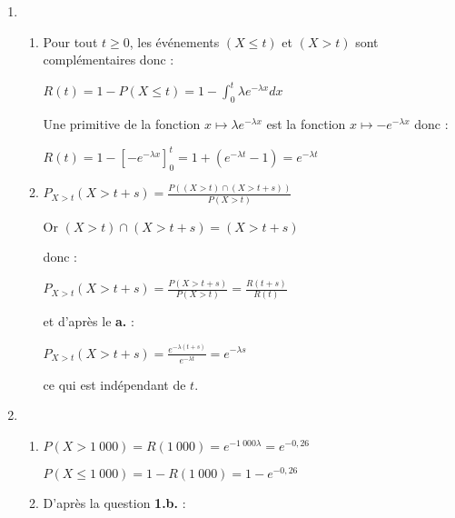 \begin{corrige}
     \begin{enumerate}
          \item
          \begin{enumerate}[label=\alph*.]
               \item  Pour tout $t\geqslant 0$, les événements $\left(X\leqslant t\right)$ et $\left(X > t\right)$ sont complémentaires donc :
               \par
               $R\left(t\right)=1-P\left(X\leqslant t\right)=1-\int_{0}^{t}\lambda  e^{-\lambda  x}dx$
               \par
               Une primitive de la fonction $x\mapsto \lambda  e^{-\lambda  x}$ est la fonction  $x\mapsto -e^{-\lambda  x}$ donc :
               \par
               $R\left(t\right)=1-\left[- e^{-\lambda  x}\right]_{0}^{t}=1+\left(e^{-\lambda  t}-1\right)=e^{-\lambda  t}$
               \item  $P_{X > t}\left(X > t+s\right)=\frac{P\left(\left(X > t\right) \cap  \left(X > t+s\right)\right)}{P\left(X > t\right)}$
               \par
               Or $\left(X > t\right) \cap  \left(X > t+s\right)=\left(X > t+s\right)$
               \par
               donc :
               \par
               $P_{X > t}\left(X > t+s\right)=\frac{P\left(X > t+s\right)}{P\left(X > t\right)}=\frac{R\left(t+s\right)}{R\left(t\right)}$
               \par
               et d'après le \textbf{a.} :
               \par
               $P_{X > t}\left(X > t+s\right)=\frac{e^{-\lambda  \left(t+s\right)}}{e^{-\lambda  t}}=e^{-\lambda  s}$
               \par
               ce qui est indépendant de $t$.
          \end{enumerate}
          \item
          \begin{enumerate}[label=\alph*.]
               \item
               $P\left(X > 1~000\right)=R\left(1~000\right)=e^{-1~000\lambda }=e^{-0,26}$
               \par
               $P\left(X\leqslant 1~000\right)=1-R\left(1~000\right)=1-e^{-0,26}$
               \item  D'après la question \textbf{1.b.} :
               \par

\end{enumerate}
\end{enumerate}
\end{corrige}
